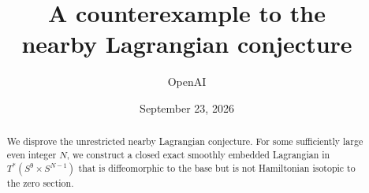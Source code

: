 \documentclass[11pt]{article}
\title{A counterexample to the\\nearby Lagrangian conjecture}
\author{OpenAI}
\date{September 23, 2026}
\begin{document}
\maketitle
\begin{abstract}
We disprove the unrestricted nearby Lagrangian conjecture. For some
sufficiently large even integer $N$, we construct a closed exact smoothly
embedded Lagrangian in $T^*(S^9\times S^{N-1})$ that is diffeomorphic to
the base but is not Hamiltonian isotopic to the zero section.
\end{abstract}






\begingroup
\raggedright
\setlength{\bibsep}{5pt}


\endgroup
\end{document}
